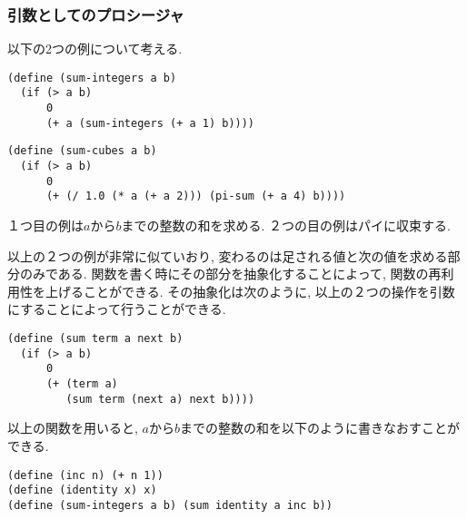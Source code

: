 \subsubsection{引数としてのプロシージャ}
以下の2つの例について考える.
%
\begin{lstlisting}[basicstyle=\footnotesize,title=$a$から$b$までの整数の和]
(define (sum-integers a b)
  (if (> a b)
      0
      (+ a (sum-integers (+ a 1) b))))
\end{lstlisting}
%
\begin{lstlisting}[basicstyle=\footnotesize,title=$\pi$の数列]
(define (sum-cubes a b)
  (if (> a b)
      0
      (+ (/ 1.0 (* a (+ a 2))) (pi-sum (+ a 4) b))))
\end{lstlisting}

１つ目の例は$a$から$b$までの整数の和を求める. ２つの目の例はパイに収束する.

以上の２つの例が非常に似ていおり, 変わるのは足される値と次の値を求める部分のみである.
関数を書く時にその部分を抽象化することによって, 関数の再利用性を上げることができる.
その抽象化は次のように, 以上の２つの操作を引数にすることによって行うことができる.
\newpage
\begin{lstlisting}[basicstyle=\footnotesize,title=一般的な和の関数]
(define (sum term a next b)
  (if (> a b)
      0
      (+ (term a)
         (sum term (next a) next b))))
\end{lstlisting}

以上の関数を用いると, $a$から$b$までの整数の和を以下のように書きなおすことができる.
%
\begin{lstlisting}[basicstyle=\footnotesize,title=一般的な和を用いた$a$から$b$までの整数]
(define (inc n) (+ n 1))
(define (identity x) x)
(define (sum-integers a b) (sum identity a inc b))
\end{lstlisting}
